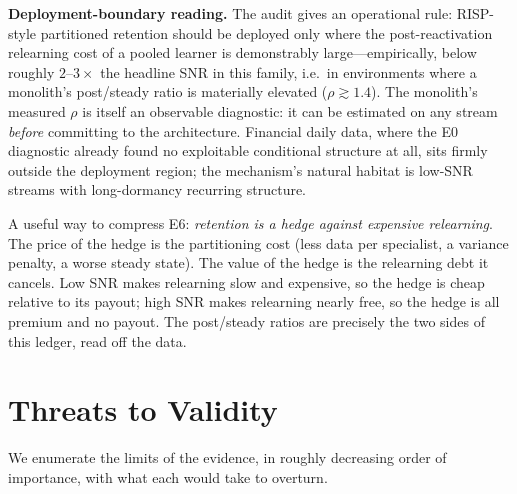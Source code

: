 \documentclass[11pt,a4paper]{article}
\theoremstyle{definition}
\theoremstyle{plain}
\begin{document}
\begin{keypoint}
\textbf{Deployment-boundary reading.} The audit gives an operational rule:
RISP-style partitioned retention should be deployed only where the
post-reactivation relearning cost of a pooled learner is demonstrably
large---empirically, below roughly $2$--$3\times$ the headline SNR in this
family, i.e.\ in environments where a monolith's post/steady ratio is
materially elevated ($\rho \gtrsim 1.4$). The monolith's measured $\rho$
is itself an observable diagnostic: it can be estimated on any stream
\emph{before} committing to the architecture. Financial daily data, where
the E0 diagnostic already found no exploitable conditional structure at
all, sits firmly outside the deployment region; the mechanism's natural
habitat is low-SNR streams with long-dormancy recurring structure.
\end{keypoint}

\begin{intuition}
A useful way to compress E6: \emph{retention is a hedge against expensive
relearning}. The price of the hedge is the partitioning cost (less data per
specialist, a variance penalty, a worse steady state). The value of the
hedge is the relearning debt it cancels. Low SNR makes relearning slow and
expensive, so the hedge is cheap relative to its payout; high SNR makes
relearning nearly free, so the hedge is all premium and no payout. The
post/steady ratios are precisely the two sides of this ledger, read off
the data.
\end{intuition}

\section{Threats to Validity}
\label{sec:dd5-threats}

We enumerate the limits of the evidence, in roughly decreasing order of
importance, with what each would take to overturn.
\end{document}
